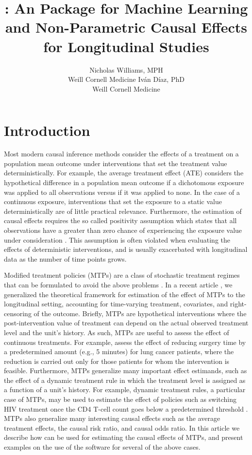 \documentclass[]{jss}
\author{
Nicholas Williams, MPH\\Weill Cornell Medicine \And Iv\'an D\'iaz,
PhD\\Weill Cornell Medicine
}
\title{\pkg{lmtp}: An \proglang{R} Package for Machine Learning and Non-Parametric Causal
Effects for Longitudinal Studies}
\begin{document}
\hypertarget{introduction}{%
\section{Introduction}\label{introduction}}

Most modern causal inference methods consider the effects of a
treatment on a population mean outcome under interventions that set
the treatment value deterministically. For example, the average
treatment effect (ATE) considers the hypothetical difference in a
population mean outcome if a dichotomous exposure was applied to all
observations versus if it was applied to none. In the case of a
continuous exposure, interventions that set the exposure to a static
value deterministically are of little practical
relevance. Furthermore, the estimation of causal effects requires the
so called positivity assumption which states that all observations
have a greater than zero chance of experiencing the exposure value
under consideration
\citep{rosenbaumCentralRolePropensity1983}. This assumption is often
violated when evaluating the effects of deterministic interventions,
and is usually exacerbated with longitudinal data as the number of
time points grows.

 
Modified treatment policies (MTPs) are a class of stochastic treatment
regimes that can be formulated to avoid the above problems
\citep{munozPopulationInterventionCausal2012,
  haneuseEstimationEffectInterventions2013}. In a recent article
\citep{diazNonparametricCausalEffects2020a}, we generalized the
theoretical framework for estimation of the effect of MTPs to the
longitudinal setting, accounting for time-varying treatment,
covariates, and right-censoring of the outcome. Briefly, MTPs are
hypothetical interventions where the post-intervention value of
treatment can depend on the actual observed treatment level and the
unit's history. As such, MTPs are useful to assess the effect of
continuous treatments. For example,
\citet{haneuseEstimationEffectInterventions2013} assess the effect of
reducing surgery time by a predetermined amount (e.g., 5 minutes) for
lung cancer patients, where the reduction is carried out only for
those patients for whom the intervention is feasible. Furthermore,
MTPs generalize many important effect estimands, such as the effect of
a dynamic treatment rule in which the treatment level is assigned as a
function of a unit's history. For example, dynamic treatment rules, a
particular case of MTPs, may be used to estimate the effect of
policies such as switching HIV treatment once the CD4 T-cell count
goes below a predetermined threshold \citep{petersen2014delayed}. MTPs
also generalize many interesting causal effects such as the average
treatment effects, the causal risk ratio, and causal odds ratio. In
this article we describe how  can be used for estimating the
causal effects of MTPs, and present examples on the use of the
software for several of the above cases.
\end{document}
